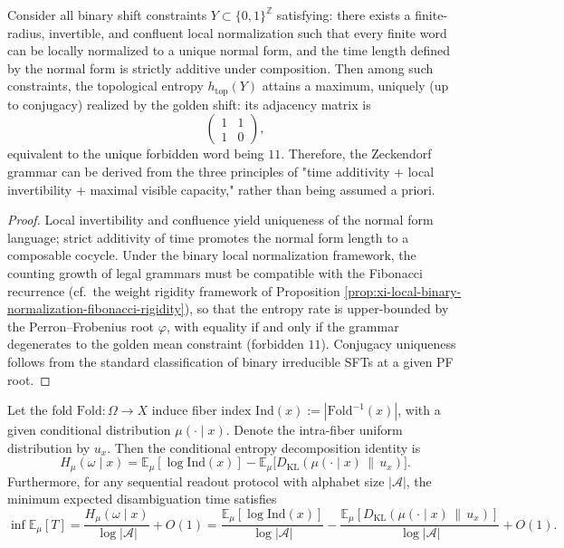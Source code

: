 \begin{theorem}\label{thm:xi-zeckendorf-golden-shift-max-capacity}
Consider all binary shift constraints \(Y\subset\{0,1\}^{\mathbb Z}\) satisfying: there exists a finite-radius, invertible, and confluent local normalization such that every finite word can be locally normalized to a unique normal form, and the time length defined by the normal form is strictly additive under composition.
Then among such constraints, the topological entropy \(h_{\mathrm{top}}(Y)\) attains a maximum, uniquely (up to conjugacy) realized by the golden shift: its adjacency matrix is
\[
\begin{pmatrix}
1 & 1\\[2pt]
1 & 0
\end{pmatrix},
\]
equivalent to the unique forbidden word being \(11\).
Therefore, the Zeckendorf grammar can be derived from the three principles of "time additivity + local invertibility + maximal visible capacity," rather than being assumed a priori.
\end{theorem}

\begin{proof}
Local invertibility and confluence yield uniqueness of the normal form language; strict additivity of time promotes the normal form length to a composable cocycle.
Under the binary local normalization framework, the counting growth of legal grammars must be compatible with the Fibonacci recurrence (cf.\ the weight rigidity framework of Proposition \ref{prop:xi-local-binary-normalization-fibonacci-rigidity}), so that the entropy rate is upper-bounded by the Perron--Frobenius root \(\varphi\), with equality if and only if the grammar degenerates to the golden mean constraint (forbidden \(11\)).
Conjugacy uniqueness follows from the standard classification of binary irreducible SFTs at a given PF root.
\end{proof}

\begin{proposition}\label{prop:xi-min-disambiguation-time-entropy-decomposition}
Let the fold \(\mathrm{Fold}:\Omega\to X\) induce fiber index \(\mathrm{Ind}(x):=|\mathrm{Fold}^{-1}(x)|\), with a given conditional distribution \(\mu(\cdot\mid x)\).
Denote the intra-fiber uniform distribution by \(u_x\).
Then the conditional entropy decomposition identity is
\[
H_\mu(\omega\mid x)
=\mathbb E_\mu[\log \mathrm{Ind}(x)]
-\mathbb E_\mu\!\bigl[D_{\mathrm{KL}}(\mu(\cdot\mid x)\,\|\,u_x)\bigr].
\]
Furthermore, for any sequential readout protocol with alphabet size \(|\mathcal A|\), the minimum expected disambiguation time satisfies
\[
\inf \mathbb E_\mu[T]
=
\frac{H_\mu(\omega\mid x)}{\log|\mathcal A|}+O(1)
=
\frac{\mathbb E_\mu[\log \mathrm{Ind}(x)]}{\log|\mathcal A|}
-\frac{\mathbb E_\mu[D_{\mathrm{KL}}(\mu(\cdot\mid x)\,\|\,u_x)]}{\log|\mathcal A|}
+O(1).
\]
\end{proposition}

